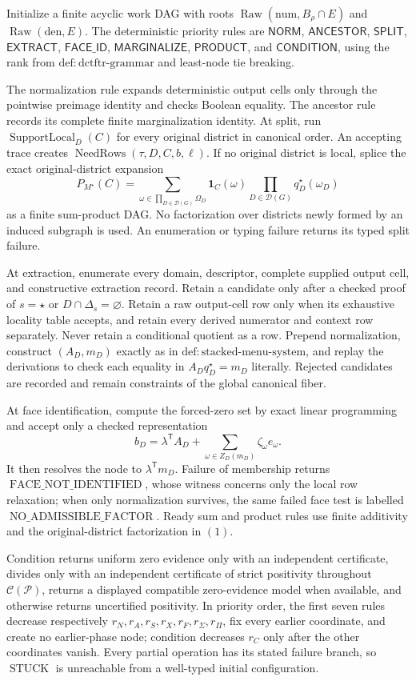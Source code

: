 Initialize a finite acyclic work DAG with roots \(\operatorname{Raw}(\mathrm{num},B_\rho\cap E)\) and \(\operatorname{Raw}(\mathrm{den},E)\).  The deterministic priority rules are \(\mathsf{NORM}\), \(\mathsf{ANCESTOR}\), \(\mathsf{SPLIT}\), \(\mathsf{EXTRACT}\), \(\mathsf{FACE\_ID}\), \(\mathsf{MARGINALIZE}\), \(\mathsf{PRODUCT}\), and \(\mathsf{CONDITION}\), using the rank from \(\mathrm{def:dctftr\text{-}grammar}\) and least-node tie breaking.

The normalization rule expands deterministic output cells only through the pointwise preimage identity and checks Boolean equality.  The ancestor rule records its complete finite marginalization identity.  At split, run \(\operatorname{SupportLocal}_D(C)\) for every original district in canonical order.  An accepting trace creates \(\operatorname{NeedRows}(\tau,D,C,b,\ell)\).  If no original district is local, splice the exact original-district expansion
\[
P_{M^\star}(C)=
\sum_{\omega\in\prod_{D\in\mathcal D(G)}\Omega_D}
\mathbf 1_C(\omega)
\prod_{D\in\mathcal D(G)}q_D^\star(\omega_D)
\tag{1}
\]
as a finite sum-product DAG.  No factorization over districts newly formed by an induced subgraph is used.  An enumeration or typing failure returns its typed split failure.

At extraction, enumerate every domain, descriptor, complete supplied output cell, and constructive extraction record.  Retain a candidate only after a checked proof of \(s=\star\) or \(D\cap\Delta_s=\varnothing\).  Retain a raw output-cell row only when its exhaustive locality table accepts, and retain every derived numerator and context row separately.  Never retain a conditional quotient as a row.  Prepend normalization, construct \((A_D,m_D)\) exactly as in \(\mathrm{def:stacked\text{-}menu\text{-}system}\), and replay the derivations to check each equality in \(A_Dq_D^\star=m_D\) literally.  Rejected candidates are recorded and remain constraints of the global canonical fiber.

At face identification, compute the forced-zero set by exact linear programming and accept only a checked representation
\[
b_D=\lambda^{\mathsf T}A_D+
\sum_{\omega\in Z_D(m_D)}\zeta_\omega e_\omega.
\tag{2}
\]
It then resolves the node to \(\lambda^{\mathsf T}m_D\).  Failure of membership returns \(\operatorname{FACE\_NOT\_IDENTIFIED}\), whose witness concerns only the local row relaxation; when only normalization survives, the same failed face test is labelled \(\operatorname{NO\_ADMISSIBLE\_FACTOR}\).  Ready sum and product rules use finite additivity and the original-district factorization in \((1)\).

Condition returns uniform zero evidence only with an independent certificate, divides only with an independent certificate of strict positivity throughout \(\mathcal C(\mathcal P)\), returns a displayed compatible zero-evidence model when available, and otherwise returns uncertified positivity.  In priority order, the first seven rules decrease respectively \(r_N,r_A,r_S,r_X,r_F,r_\Sigma,r_\Pi\), fix every earlier coordinate, and create no earlier-phase node; condition decreases \(r_C\) only after the other coordinates vanish.  Every partial operation has its stated failure branch, so \(\operatorname{STUCK}\) is unreachable from a well-typed initial configuration.